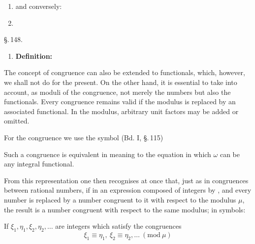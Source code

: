 \begin{enumerate}
\item[] and conversely:
\item[2.] 
\end{enumerate}

\S.\,148.


\begin{enumerate}
\item[1.] \textbf{Definition:} 
\end{enumerate}

The concept of congruence can also be extended to functionals,
which, however, we shall not do for the present. On the other hand,
it is essential to take into account, as moduli of the congruence,
not merely the numbers but also the functionals. Every congruence
remains valid if the modulus is replaced by an associated
functional. In the modulus, arbitrary unit factors may be added
or omitted.

For the congruence we use the  symbol
(Bd. I, \S.\,115)

Such a congruence is equivalent in meaning to the equation
in which $\omega$ can be any integral functional.

From this representation one then recognises at once that, just
as in congruences between rational numbers, if in an expression
composed of integers by ,  and 
every number is replaced by a number congruent to it with respect
to the modulus $\mu$, the result is a number congruent with respect
to the same modulus; in symbols:

If $\xi_1, \eta_1, \xi_2, \eta_2, \ldots$ are integers which satisfy the congruences
\[
\xi_1 \equiv \eta_1, \ \xi_2 \equiv \eta_2, \ldots \ (\mathrm{mod}\ \mu)
\]
